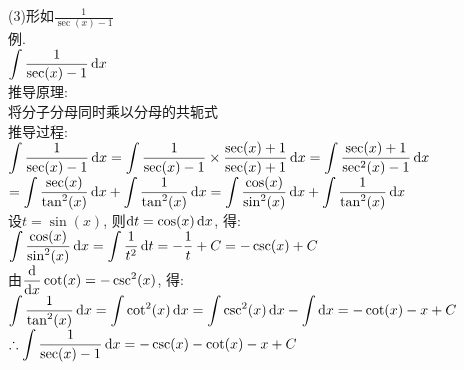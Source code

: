 (3)形如$\displaystyle\frac{1}{\sec(x)-1}$\\
例.\\
$\displaystyle\int\frac{1}{\sec(x)-1}\mathop{}\!\mathrm{d} x$\\
推导原理:\\
将分子分母同时乘以分母的共轭式\\
推导过程:\\
$\displaystyle\int\frac{1}{\sec(x)-1}\mathop{}\!\mathrm{d} x=\int\frac{1}{\sec(x)-1}\times\frac{\sec(x)+1}{\sec(x)+1}\mathop{}\!\mathrm{d} x=\int\frac{\sec(x)+1}{\sec^2(x)-1}\mathop{}\!\mathrm{d} x$\\
$\displaystyle=\int\frac{\sec(x)}{\tan^2(x)}\mathop{}\!\mathrm{d} x+\int\frac{1}{\tan^2(x)}\mathop{}\!\mathrm{d} x=\int\frac{\cos(x)}{\sin^2(x)}\mathop{}\!\mathrm{d} x+\int\frac{1}{\tan^2(x)}\mathop{}\!\mathrm{d} x$\\
设$t=\sin(x)$, 则$\mathop{}\!\mathrm{d} t=\cos(x)\mathop{}\!\mathrm{d} x$, 得:\\
$\displaystyle\int\frac{\cos(x)}{\sin^2(x)}\mathop{}\!\mathrm{d} x=\int\frac{1}{t^2}\mathop{}\!\mathrm{d} t=-\frac{1}{t}+C=-\csc(x)+C$\\
由$\displaystyle\frac{\mathop{}\!\mathrm{d}}{\mathop{}\!\mathrm{d} x}\cot(x)=-\csc^2(x)$, 得:\\
$\displaystyle\int\frac{1}{\tan^2(x)}\mathop{}\!\mathrm{d} x=\int\cot^2(x)\mathop{}\!\mathrm{d} x=\int\csc^2(x)\mathop{}\!\mathrm{d} x-\int\mathop{}\!\mathrm{d} x=-\cot(x)-x+C$\\
$\therefore\displaystyle\int\frac{1}{\sec(x)-1}\mathop{}\!\mathrm{d} x=-\csc(x)-\cot(x)-x+C$\\

